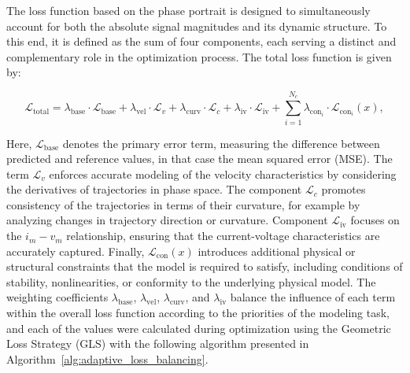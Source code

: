 \documentclass[11pt, oneside]{article}
\begin{document}
The loss function based on the phase portrait is designed to simultaneously account for both the absolute signal magnitudes and its dynamic structure. To this end, it is defined as the sum of four components, each serving a distinct and complementary role in the optimization process. The total loss function is given by:

\begin{equation}
    \mathcal{L}_{\mathrm{total}} = \lambda_{\mathrm{base}} \cdot \mathcal{L}_{\mathrm{base}} + \lambda_{\mathrm{vel}} \cdot \mathcal{L}_{v} + \lambda_{\mathrm{curv}} \cdot \mathcal{L}_{c} + \lambda_{\mathrm{iv}} \cdot \mathcal{L}_{\mathrm{iv}} +\sum^{N_c}_{i=1} \lambda_{\mathrm{con}_i} \cdot \mathcal{L}_{\mathrm{con}_i}(x),
    \label{eq:loss_function}
\end{equation}

Here, $\mathcal{L}_{\mathrm{base}}$ denotes the primary error term,  measuring the difference between predicted and reference values, in that case the mean squared error (MSE). The term $\mathcal{L}_{v}$ enforces accurate modeling of the velocity characteristics by considering the derivatives of trajectories in phase space. The component $\mathcal{L}_{c}$ promotes consistency of the trajectories in terms of their curvature, for example by analyzing changes in trajectory direction or curvature.
Component $\mathcal{L}_{\mathrm{iv}}$ focuses on the $i_m-v_m$ relationship, ensuring that the current-voltage characteristics are accurately captured. Finally, $\mathcal{L}_{\mathrm{con}}(x)$ introduces additional physical or structural constraints that the model is required to satisfy, including conditions of stability, nonlinearities, or conformity to the underlying physical model. The weighting coefficients $\lambda_{\mathrm{base}}$, $\lambda_{\mathrm{vel}}$, $\lambda_{\mathrm{curv}}$, and $\lambda_{\mathrm{iv}}$ balance the influence of each term within the overall loss function according to the priorities of the modeling task, and each of the values were calculated during optimization using the Geometric Loss Strategy (GLS) with the following algorithm presented in Algorithm~\ref{alg:adaptive_loss_balancing}.
\end{document}

